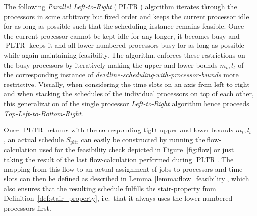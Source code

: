 \documentclass[a4paper]{article}
\DeclareMathOperator{\pltr}{pltr}
\DeclareMathOperator{\PLTR}{PLTR}
\begin{document}
The following \emph{Parallel Left-to-Right} ($\PLTR$) algorithm iterates through the processors in some arbitrary but fixed order and keeps the current processor idle for as long as possible such that the scheduling instance remains feasible.
Once the current processor cannot be kept idle for any longer, it becomes busy and $\PLTR$ keeps it and all lower-numbered processors busy for as long as possible while again maintaining feasibility.
The algorithm enforces these restrictions on the busy processors by iteratively making the upper and lower bounds $m_t, l_t$ of the corresponding instance of \emph{deadline-scheduling-with-processor-bounds} more restrictive.
Visually, when considering the time slots on an axis from left to right and when stacking the schedules of the individual processors on top of each other, this generalization of the single processor \emph{Left-to-Right} algorithm hence proceeds \emph{Top-Left-to-Bottom-Right}.

Once $\PLTR$ returns with the corresponding tight upper and lower bounds $m_t, l_t$ , an actual schedule $S_{\pltr}$ can easily be constructed by running the flow-calculation used for the feasibility check depicted in Figure~\ref{fig:flow} or just taking the result of the last flow-calculation performed during $\PLTR$.
The mapping from this flow to an actual assignment of jobs to processors and time slots can then be defined as described in Lemma~\ref{lemma:flow_feasibility}, which also ensures that the resulting schedule fulfills the stair-property from Definition~\ref{def:stair_property}, i.e.\ that it always uses the lower-numbered processors first.
\end{document}
